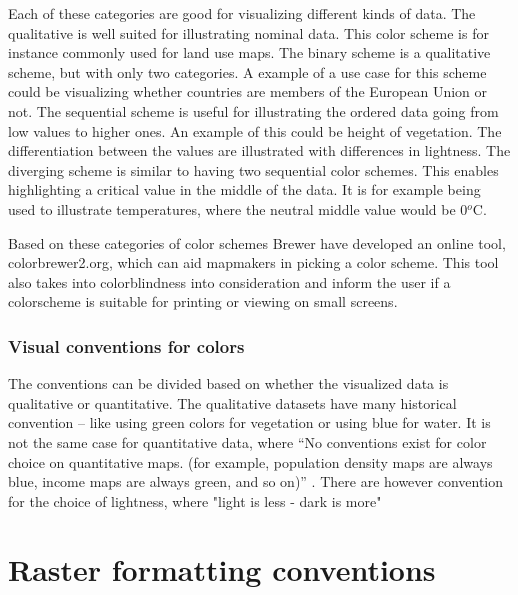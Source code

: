Each of these categories are good for visualizing different kinds of data. The qualitative is well suited for illustrating nominal data. This color scheme is for instance commonly used for land use maps. The binary scheme is a qualitative scheme, but with only two categories. A example of a use case for this scheme could be visualizing whether countries are members of the European Union or not. 
The sequential scheme is useful for illustrating the ordered data going from low values to higher ones. An example of this could be height of vegetation. The differentiation between the values are illustrated with differences in lightness.
The diverging scheme is similar to having two sequential color schemes. This enables highlighting a critical value in the middle of the data. It is for example being used to illustrate temperatures, where the neutral middle value would be 0$^o$C. \citep{Brewer94}


Based on these categories of color schemes Brewer have developed an online tool, colorbrewer2.org, which can aid mapmakers in picking a color scheme. This tool also takes into colorblindness into consideration and inform the user if a colorscheme is suitable for printing or viewing on small screens. 




\subsubsection{Visual conventions for colors}
The conventions can be divided based on whether the visualized data is qualitative or quantitative. The qualitative datasets have many historical convention – like using green colors for vegetation or using blue for water. 
It is not the same case for quantitative data, where “No conventions exist for color choice on quantitative maps. (for example, population density maps are always blue, income maps are always green, and so on)” \citep{Dent}. There are however convention for the choice of lightness, where "light is less - dark is more"









\section{Raster formatting conventions}

